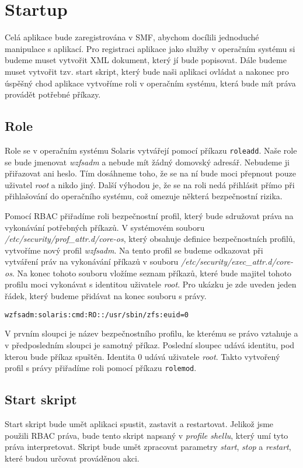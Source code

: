 \section{Startup}
Celá aplikace bude zaregistrována v SMF, abychom docílili jednoduché manipulace s aplikací. Pro registraci aplikace jako služby v operačním systému si budeme muset vytvořit XML dokument, který jí bude popisovat. Dále budeme muset vytvořit tzv. start skript, který bude naši aplikaci ovládat a nakonec pro úspěšný chod aplikace vytvoříme roli v operačním systému, která bude mít práva provádět potřebné příkazy.
\subsection{Role}
Role se v operačním systému Solaris vytvářejí pomocí příkazu \verb|roleadd|. Naše role se bude jmenovat \emph{wzfsadm} a nebude mít žádný domovský adresář. Nebudeme ji přiřazovat ani heslo. Tím dosáhneme toho, že se na ní bude moci přepnout pouze uživatel \emph{root} a nikdo jiný. Další výhodou je, že se na roli nedá přihlásit přímo při přihlašování do operačního systému, což omezuje některá bezpečnostní rizika.

Pomocí RBAC přiřadíme roli bezpečnostní profil, který bude sdružovat práva na vykonávání potřebných příkazů. V systémovém souboru \emph{/etc/security/prof\_attr.d/core-os}, který obsahuje definice bezpečnostních profilů, vytvoříme nový profil \emph{wzfsadm}. Na tento profil se budeme odkazovat při vytváření práv na vykonávání příkazů v souboru \emph{/etc/security/exec\_attr.d/core-os}. Na konec tohoto souboru vložíme seznam příkazů, které bude majitel tohoto profilu moci vykonávat s identitou uživatele \emph{root}. Pro ukázku je zde uveden jeden řádek, který budeme přidávat na konec souboru s právy.
\begin{verbatim}
wzfsadm:solaris:cmd:RO::/usr/sbin/zfs:euid=0
\end{verbatim}
V prvním sloupci je název bezpečnostního profilu, ke kterému se právo vztahuje a v předposledním sloupci je samotný příkaz. Poslední sloupec udává identitu, pod kterou bude příkaz spuštěn. Identita 0 udává uživatele \emph{root}. Takto vytvořený profil s právy přiřadíme roli pomocí příkazu \verb|rolemod|.
\subsection{Start skript}
Start skript bude umět aplikaci spustit, zastavit a restartovat. Jelikož jsme použili RBAC práva, bude tento skript napsaný v \emph{profile shellu}, který umí tyto práva interpretovat. Skript bude umět zpracovat parametry \emph{start}, \emph{stop} a \emph{restart}, které budou určovat prováděnou akci.

